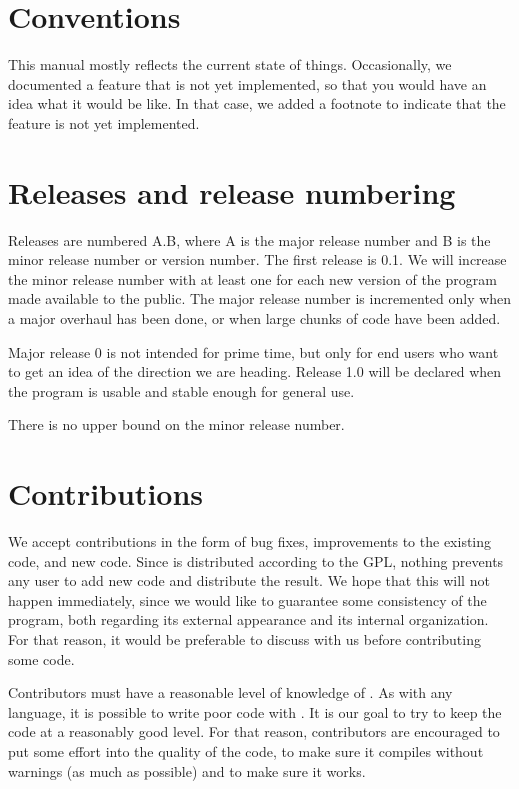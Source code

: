 \section{Conventions}

This manual mostly reflects the current state of things.  Occasionally,
we documented a feature that is not yet implemented, so that you would
have an idea what it would be like.  In that case, we added a footnote
to indicate that the feature is not yet implemented. 

\section{Releases and release numbering}

Releases are numbered A.B, where A is the major release number and B
is the minor release number or version number.  The first release is
0.1.  We will increase the minor release number with at least one for
each new version of the program made available to the public.  The
major release number is incremented only when a major overhaul has
been done, or when large chunks of code have been added.  

Major release 0 is not intended for prime time, but only for end users
who want to get an idea of the direction we are heading.  Release 1.0
will be declared when the program is usable and stable enough for
general use. 

There is no upper bound on the minor release number.

\section{Contributions}

We accept contributions in the form of bug fixes, improvements to the
existing code, and new code.  Since {\gs} is distributed according to
the GPL, nothing prevents any user to add new code and distribute the
result.  We hope that this will not happen immediately, since we would
like to guarantee some consistency of the program, both regarding its
external appearance and its internal organization.  For that reason,
it would be preferable to discuss with us before contributing some
code. 

Contributors must have a reasonable level of knowledge of {\commonlisp}.  As
with any language, it is possible to write poor code with {\commonlisp}.  It
is our goal to try to keep the code at a reasonably good level.  For
that reason, contributors are encouraged to put some effort into the
quality of the code, to make sure it compiles without warnings (as
much as possible) and to make sure it works.

